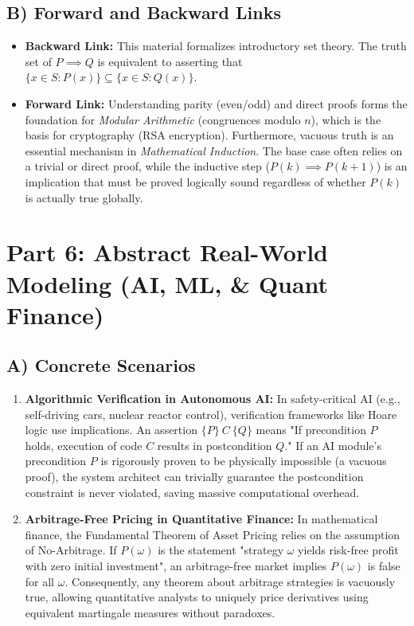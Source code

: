 \documentclass[11pt]{article}
\theoremstyle{remark}
\begin{document}
\subsection{B) Forward and Backward Links}
\begin{itemize}
    \item \textbf{Backward Link:} This material formalizes introductory set theory. The truth set of $P \implies Q$ is equivalent to asserting that $\{x \in S : P(x)\} \subseteq \{x \in S : Q(x)\}$. 
    \item \textbf{Forward Link:} Understanding parity (even/odd) and direct proofs forms the foundation for \textit{Modular Arithmetic} (congruences modulo $n$), which is the basis for cryptography (RSA encryption). Furthermore, vacuous truth is an essential mechanism in \textit{Mathematical Induction}. The base case often relies on a trivial or direct proof, while the inductive step ($P(k) \implies P(k+1)$) is an implication that must be proved logically sound regardless of whether $P(k)$ is actually true globally.
\end{itemize}

\section{Part 6: Abstract Real-World Modeling (AI, ML, \& Quant Finance)}

\subsection{A) Concrete Scenarios}
\begin{enumerate}
    \item \textbf{Algorithmic Verification in Autonomous AI:} In safety-critical AI (e.g., self-driving cars, nuclear reactor control), verification frameworks like Hoare logic use implications. An assertion $\{P\} \ C \ \{Q\}$ means "If precondition $P$ holds, execution of code $C$ results in postcondition $Q$." If an AI module's precondition $P$ is rigorously proven to be physically impossible (a vacuous proof), the system architect can trivially guarantee the postcondition constraint is never violated, saving massive computational overhead.
    \item \textbf{Arbitrage-Free Pricing in Quantitative Finance:} In mathematical finance, the Fundamental Theorem of Asset Pricing relies on the assumption of No-Arbitrage. If $P(\omega)$ is the statement "strategy $\omega$ yields risk-free profit with zero initial investment", an arbitrage-free market implies $P(\omega)$ is false for all $\omega$. Consequently, any theorem about arbitrage strategies is vacuously true, allowing quantitative analysts to uniquely price derivatives using equivalent martingale measures without paradoxes.
\end{enumerate}
\end{document}
